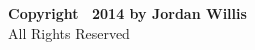 \clearpage
\vspace*{\fill}
\begin{center}
\textbf{Copyright \textcopyright~2014 by Jordan Willis} \\
All Rights Reserved
\end{center}
\vfill %
\clearpage